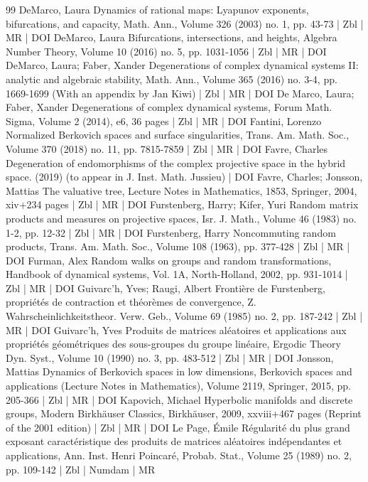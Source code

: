 \documentclass[10pt]{amsart}
\theoremstyle{definition}\newtheorem{defi}[theo]{Definition}\newtheorem{rema}[theo]{Remark}\newtheorem{exam}[theo]{Example}\newtheorem{exem}[theo]{Example}\newtheorem{nota}[theo]{Notation}
\begin{document}
\begin{thebibliography}{99}
DeMarco, Laura Dynamics of rational maps: Lyapunov exponents, bifurcations, and capacity, Math. Ann., Volume 326 (2003) no. 1, pp. 43-73 | Zbl | MR | DOI
DeMarco, Laura Bifurcations, intersections, and heights, Algebra Number Theory, Volume 10 (2016) no. 5, pp. 1031-1056 | Zbl | MR | DOI
DeMarco, Laura; Faber, Xander Degenerations of complex dynamical systems II: analytic and algebraic stability, Math. Ann., Volume 365 (2016) no. 3-4, pp. 1669-1699 (With an appendix by Jan Kiwi) | Zbl | MR | DOI
De Marco, Laura; Faber, Xander Degenerations of complex dynamical systems, Forum Math. Sigma, Volume 2 (2014), e6, 36 pages | Zbl | MR | DOI
Fantini, Lorenzo Normalized Berkovich spaces and surface singularities, Trans. Am. Math. Soc., Volume 370 (2018) no. 11, pp. 7815-7859 | Zbl | MR | DOI
Favre, Charles Degeneration of endomorphisms of the complex projective space in the hybrid space. (2019) (to appear in J. Inst. Math. Jussieu) | DOI
Favre, Charles; Jonsson, Mattias The valuative tree, Lecture Notes in Mathematics, 1853, Springer, 2004, xiv+234 pages | Zbl | MR | DOI
Furstenberg, Harry; Kifer, Yuri Random matrix products and measures on projective spaces, Isr. J. Math., Volume 46 (1983) no. 1-2, pp. 12-32 | Zbl | MR | DOI
Furstenberg, Harry Noncommuting random products, Trans. Am. Math. Soc., Volume 108 (1963), pp. 377-428 | Zbl | MR | DOI
Furman, Alex Random walks on groups and random transformations, Handbook of dynamical systems, Vol. 1A, North-Holland, 2002, pp. 931-1014 | Zbl | MR | DOI
Guivarc’h, Yves; Raugi, Albert Frontière de Furstenberg, propriétés de contraction et théorèmes de convergence, Z. Wahrscheinlichkeitstheor. Verw. Geb., Volume 69 (1985) no. 2, pp. 187-242 | Zbl | MR | DOI
Guivarc’h, Yves Produits de matrices aléatoires et applications aux propriétés géométriques des sous-groupes du groupe linéaire, Ergodic Theory Dyn. Syst., Volume 10 (1990) no. 3, pp. 483-512 | Zbl | MR | DOI
Jonsson, Mattias Dynamics of Berkovich spaces in low dimensions, Berkovich spaces and applications (Lecture Notes in Mathematics), Volume 2119, Springer, 2015, pp. 205-366 | Zbl | MR | DOI
Kapovich, Michael Hyperbolic manifolds and discrete groups, Modern Birkhäuser Classics, Birkhäuser, 2009, xxviii+467 pages (Reprint of the 2001 edition) | Zbl | MR | DOI
Le Page, Émile Régularité du plus grand exposant caractéristique des produits de matrices aléatoires indépendantes et applications, Ann. Inst. Henri Poincaré, Probab. Stat., Volume 25 (1989) no. 2, pp. 109-142 | Zbl | Numdam | MR

\end{thebibliography}
\end{document}
